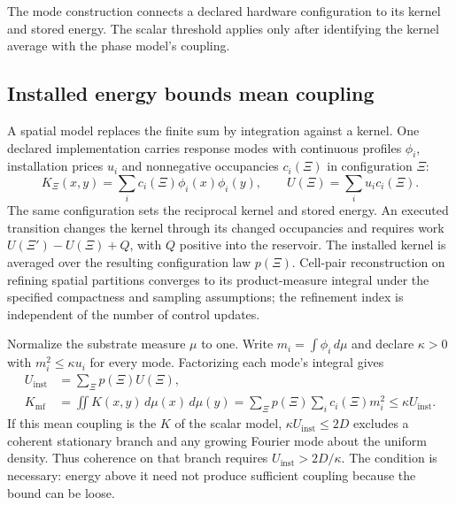 \documentclass{article}
\begin{document}
The mode construction connects a declared hardware configuration to its kernel and stored energy. The scalar threshold applies only after identifying the kernel average with the phase model's coupling.

\subsection{Installed energy bounds mean coupling}
\label{sec:installation}

A spatial model replaces the finite sum by integration against a kernel. One declared implementation carries response modes with continuous profiles $\phi_i$, installation prices $u_i$ and nonnegative occupancies $c_i(\Xi)$ in configuration $\Xi$:
\begin{equation}
 K_\Xi(x,y)=\sum_i c_i(\Xi)\phi_i(x)\phi_i(y),
 \qquad U(\Xi)=\sum_i u_i c_i(\Xi).
 \label{eq:microscopic-kernel}
\end{equation}
The same configuration sets the reciprocal kernel and stored energy. An executed transition changes the kernel through its changed occupancies and requires work $U(\Xi')-U(\Xi)+Q$, with $Q$ positive into the reservoir. The installed kernel is averaged over the resulting configuration law $p(\Xi)$. Cell-pair reconstruction on refining spatial partitions converges to its product-measure integral under the specified compactness and sampling assumptions; the refinement index is independent of the number of control updates.

Normalize the substrate measure $\mu$ to one. Write $m_i=\int\phi_i\,d\mu$ and declare $\kappa>0$ with $m_i^2\leq\kappa u_i$ for every mode. Factorizing each mode's integral gives
\begin{equation}
 \begin{aligned}
 U_{\mathrm{inst}}&=\sum_\Xi p(\Xi)U(\Xi),\\
 K_{\mathrm{mf}}&=\iint K(x,y)\,d\mu(x)\,d\mu(y)
 =\sum_\Xi p(\Xi)\sum_i c_i(\Xi)m_i^2
 \leq\kappa U_{\mathrm{inst}}.
 \end{aligned}
 \label{eq:installed-coupling-bound}
\end{equation}
If this mean coupling is the $K$ of the scalar model, $\kappa U_{\mathrm{inst}}\leq2D$ excludes a coherent stationary branch and any growing Fourier mode about the uniform density. Thus coherence on that branch requires $U_{\mathrm{inst}}>2D/\kappa$. The condition is necessary: energy above it need not produce sufficient coupling because the bound can be loose.
\end{document}
